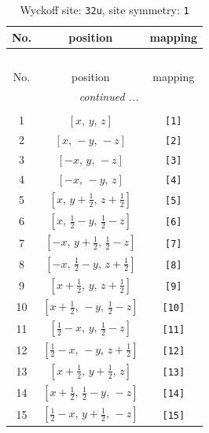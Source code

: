 \documentclass[fleqn,8pt]{jsarticle}
\begin{document}
\renewcommand{\arraystretch}{1.2}
\begin{longtable}{ccc}
\caption{Wyckoff site: {\tt 32u}, site symmetry: {\tt 1}}
 \\
 \hline \hline
No. & position & mapping \\ \hline \endfirsthead

\multicolumn{2}{l}{\tablename\ \thetable{}} \\
 \hline \hline
No. & position & mapping \\ \hline \endhead

 \hline \hline
\multicolumn{2}{r}{\footnotesize\it continued ...} \\ \endfoot

 \hline \hline
\multicolumn{2}{r}{} \\ \endlastfoot

1 & $\left[ x,\, y,\, z \right]$ & {\tt [1]} \\ \hline
2 & $\left[ x,\, - y,\, - z \right]$ & {\tt [2]} \\ \hline
3 & $\left[ - x,\, y,\, - z \right]$ & {\tt [3]} \\ \hline
4 & $\left[ - x,\, - y,\, z \right]$ & {\tt [4]} \\ \hline
5 & $\left[ x,\, y + \frac{1}{2},\, z + \frac{1}{2} \right]$ & {\tt [5]} \\ \hline
6 & $\left[ x,\, \frac{1}{2} - y,\, \frac{1}{2} - z \right]$ & {\tt [6]} \\ \hline
7 & $\left[ - x,\, y + \frac{1}{2},\, \frac{1}{2} - z \right]$ & {\tt [7]} \\ \hline
8 & $\left[ - x,\, \frac{1}{2} - y,\, z + \frac{1}{2} \right]$ & {\tt [8]} \\ \hline
9 & $\left[ x + \frac{1}{2},\, y,\, z + \frac{1}{2} \right]$ & {\tt [9]} \\ \hline
10 & $\left[ x + \frac{1}{2},\, - y,\, \frac{1}{2} - z \right]$ & {\tt [10]} \\ \hline
11 & $\left[ \frac{1}{2} - x,\, y,\, \frac{1}{2} - z \right]$ & {\tt [11]} \\ \hline
12 & $\left[ \frac{1}{2} - x,\, - y,\, z + \frac{1}{2} \right]$ & {\tt [12]} \\ \hline
13 & $\left[ x + \frac{1}{2},\, y + \frac{1}{2},\, z \right]$ & {\tt [13]} \\ \hline
14 & $\left[ x + \frac{1}{2},\, \frac{1}{2} - y,\, - z \right]$ & {\tt [14]} \\ \hline
15 & $\left[ \frac{1}{2} - x,\, y + \frac{1}{2},\, - z \right]$ & {\tt [15]} \\ \hline

\end{longtable}
\end{document}
